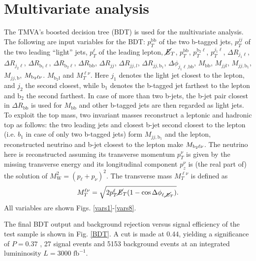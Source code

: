 \documentclass[10pt,a4paper]{article}
\renewcommand{\b}{\text{b}}
\newcommand{\lnu}{\ensuremath{\ell\nu}}
\newcommand{\MET}{\ensuremath{\cancel{\it{E}}_{T}}}
\begin{document}
\section{Multivariate analysis}


The TMVA's boosted decision tree (BDT) is used for the multivariate analysis. The following are input variables for the BDT:
$p_T^\text{bb}$ of the two b-tagged jets,
$p_T^{jj}$ of the two leading ``light'' jets,
$p_T^\ell$ of the leading lepton,
\MET,
$p_T^\text{bb}$,
$p_T^{\text{b}_2\ell}$,
$p_T^{j_1\ell}$,
$\Delta R_{j_1\ell}$,
$\Delta R_{j_2\ell}$,
$\Delta R_{\text{b}_1\ell}$,
$\Delta R_{\text{b}_2\ell}$,
$\Delta R_{\b\b}$,
$\Delta R_{jj}$,
$\Delta R_{jj,l}$,
$\Delta R_{jj,\text{b}_1}$,
$\Delta\phi_{j_1\ell\text{,bb}}$,
$M_{\b\b}$,
$M_{jjl}$,
$M_{jj,\text{b}_1}$,
$M_{jj,\text{b}}$,
$M_{\text{b}_2\text{\lnu}}$.
$M_{\text{b}_2\text{\l}}$ and
$M_T^{\ell\nu}$.
Here $j_1$ denotes the light jet closest to the lepton, and $j_2$ the second closest, while $\text{b}_1$ denotes the b-tagged jet farthest to the lepton and $\text{b}_2$ the second farthest. In case of more than two b-jets, the b-jet pair closest in $\Delta R_{\b\b}$ is used for $M_{\b\b}$ and other b-tagged jets are then regarded as light jets.
To exploit the top mass, two invariant masses reconstruct a leptonic and hadronic top as follows: the two leading jets and closest b-jet second closest to the lepton (i.e. $b_1$ in case of only two b-tagged jets) form $M_{jj,\text{b}_1}$ and the lepton, reconstructed neutrino and b-jet closest to the lepton make $M_{\text{b}_2\text{\lnu}}$. The neutrino here is reconstructed assuming its transverse momentum $p^\nu_T$ is given by the missing transverse energy and its longitudinal component $p^\nu_z$ is (the real part of) the solution of $M_\text{W}^2 = (p_\ell + p_\nu)^2$.
The transverse mass $M_T^{\ell\nu}$ is defined as
\begin{equation} \label{MT}
	M_T^{\ell\nu} = \sqrt{ 2 p_T^\ell \text{\MET} ( 1 - \cos \Delta \phi_{\ell,\text{\MET}} )}.
\end{equation}
All variables are shown Figs. \ref{vars1}-\ref{vars8}.

The final BDT output and background rejection versus signal efficiency of the test sample is shown in Fig. \ref{BDT}. A cut is made at 0.44, yielding a significance of $P=0.37$ %
, 27 signal events and 5153 background events at an integrated lumininosity $L = 3000 \text{ fb}^{-1}$.
\end{document}
